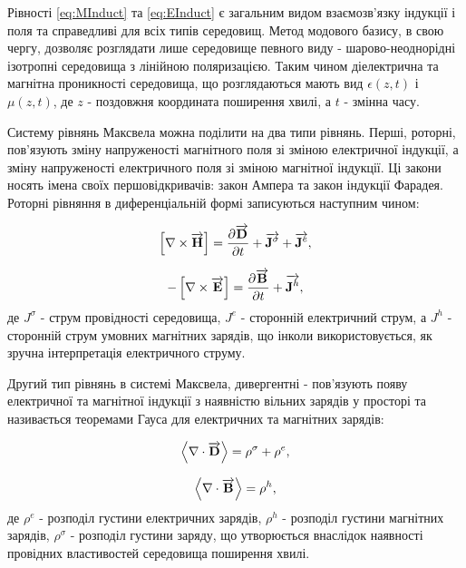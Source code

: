 Рівності \eqref{eq:MInduct} та \eqref{eq:EInduct} є загальним видом 
взаємозв'язку індукції і поля та справедливі для всіх типів середовищ.
Метод модового базису, в свою чергу, дозволяє розглядати лише середовище 
певного виду - шарово-неоднорідні ізотропні середовища з лінійною поляризацією.
Таким чином діелектрична та магнітна проникності середовища, що розглядаються 
мають вид $ \epsilon(z,t) $ і $ \mu(z,t) $, де $ z $ - поздовжня координата 
поширення хвилі, а $ t $ - змінна часу.

Систему рівнянь Максвела можна поділити на два типи рівнянь. Перші, роторні,
пов'язують зміну напруженості магнітного поля зі зміною електричної індукції, 
а зміну напруженості електричного поля зі зміною магнітної індукції. Ці закони 
носять імена своїх першовідкривачів: закон Ампера та закон індукції Фарадея.
Роторні рівняння в диференціальній формі записуються наступним чином:

\begin{equation} \label{eq:AmpereLow}
\left[ \nabla \times \overrightarrow{\mathbf H} \right] = 
\frac{\partial \overrightarrow{\mathbf D}}{\partial t} + \overrightarrow{\mathbf J^\sigma} + \overrightarrow{\mathbf J^e},
\end{equation}

\begin{equation} \label{eq:FaradayInduction}
- \left[ \nabla \times \overrightarrow{\mathbf E} \right] =
\frac{\partial \overrightarrow{\mathbf B}}{\partial t} + \overrightarrow{\mathbf J^h},
\end{equation}
%
де $ J^\sigma $ - струм провідності середовища, $ J^e $ - сторонній 
електричний струм, а $ J^h $ - сторонній струм умовних магнітних зарядів, що
інколи використовується, як зручна інтерпретація електричного струму.

Другий тип рівнянь в системі Максвела, дивергентні - пов'язують появу 
електричної та магнітної індукції з наявністю вільних зарядів у просторі 
та називається теоремами Гауса для електричних та магнітних зарядів:

\begin{equation} \label{eq:GaussTheorem}
\left< \nabla \cdot \overrightarrow{\mathbf D} \right> = \rho^\sigma + \rho^e,
\end{equation}

\begin{equation} \label{eq:GaussMagnetic}
\left< \nabla \cdot \overrightarrow{\mathbf B} \right> = \rho^h,
\end{equation}
%
де $ \rho^e $ - розподіл густини електричних зарядів, $ \rho^h $ - розподіл
густини магнітних зарядів, $ \rho^\sigma $ - розподіл густини заряду, що
утворюється внаслідок наявності провідних властивостей середовища 
поширення хвилі.

